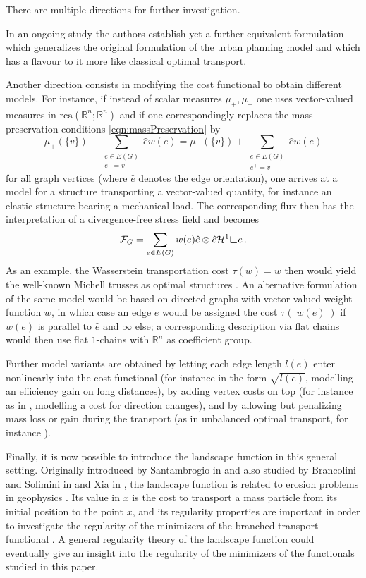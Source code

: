 \documentclass[10pt,a4paper,oneside,final]{article}
\newcommand{\R}{{\mathbb{R}}}
\newcommand{\hdone}{\mathcal{H}^1}
\newcommand{\rca}{\mathrm{rca}}
\newcommand{\restr}{{\mbox{\LARGE$\llcorner$}}}
\newcommand{\flux}{{\mathcal{F}}}
\numberwithin{equation}{section}
\theoremstyle{plain}
\theoremstyle{definition}
\theoremstyle{remark}
\begin{document}
There are multiple directions for further investigation.

In an ongoing study the authors establish yet a further equivalent formulation
which generalizes the original formulation of the urban planning model and which has a flavour to it more like classical optimal transport.

Another direction consists in modifying the cost functional to obtain different models.
For instance, if instead of scalar measures $\mu_+,\mu_-$ one uses vector-valued measures in $\rca(\R^n;\R^n)$
and if one correspondingly replaces the mass preservation conditions \eqref{eqn:massPreservation} by
\begin{equation*}
\mu_+(\{v\}) + \sum_{\substack{e \in E(G)\\e^- = v}} \hat ew(e) = \mu_-(\{v\}) + \sum_{\substack{e \in E(G)\\e^+ = v}} \hat ew(e)
\end{equation*}
for all graph vertices (where $\hat e$ denotes the edge orientation), one arrives at a model for a structure transporting a vector-valued quantity, for instance an elastic structure bearing a mechanical load.
The corresponding flux then has the interpretation of a divergence-free stress field and becomes
\begin{equation*}
\flux_G=\sum_{e\in E(G)}w(e)\hat e\otimes\hat e\hdone\restr e\,.
\end{equation*}
As an example, the Wasserstein transportation cost $\tau(w)=w$ then would yield the well-known Michell trusses as optimal structures \cite{Mi94}.
An alternative formulation of the same model would be based on directed graphs with vector-valued weight function $w$,
in which case an edge $e$ would be assigned the cost $\tau(|w(e)|)$ if $w(e)$ is parallel to $\hat e$ and $\infty$ else;
a corresponding description via flat chains would then use flat $1$-chains with $\R^n$ as coefficient group.

Further model variants are obtained by letting each edge length $l(e)$ enter nonlinearly into the cost functional (for instance in the form $\sqrt{l(e)}$, modelling an efficiency gain on long distances),
by adding vertex costs on top (for instance as in \cite{BrPoWi12}, modelling a cost for direction changes),
and by allowing but penalizing mass loss or gain during the transport (as in unbalanced optimal transport, for instance \cite{DNSTransportDistances09}).

Finally, it is now possible to introduce the landscape function in this general setting.
Originally introduced by Santambrogio in \cite{Santambrogio-Landscape} and also studied by Brancolini and Solimini in \cite{Brancolini-Solimini-Hoelder} and Xia in \cite{Xia-Landscape},
the landscape function is related to erosion problems in geophysics \cite{Banavar2001,FractalBasins}.
Its value in $x$ is the cost to transport a mass particle from its initial position to the point $x$,
and its regularity properties are important in order to investigate the regularity of the minimizers of the branched transport functional \cite{Brancolini-Solimini-Fractal}.
A general regularity theory of the landscape function could eventually give an insight into the regularity of the minimizers of the functionals studied in this paper.
\end{document}
